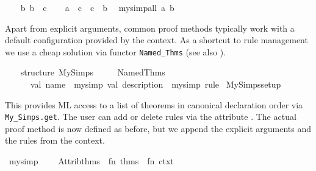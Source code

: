 \begin{isabellebody}
\ \ \isamarkupfalse%
\ b{\isacharcolon}\ {\isachardoublequoteopen}b\ {\isacharequal}\ c{\isachardoublequoteclose}\isanewline
\ \ \isamarkupfalse%
\ {\isachardoublequoteopen}a\ {\isacharequal}\ c{\isachardoublequoteclose}\ \ {\isachardoublequoteopen}c\ {\isacharequal}\ b{\isachardoublequoteclose}\ \isamarkupfalse%
\ {\isacharparenleft}my{\isacharunderscore}simp{\isacharunderscore}all\ a\ b{\isacharparenright}\isanewline
\isanewline
{}\isamarkupfalse%
%
\endisatagproof
{\isafoldproof}%
%
\isadelimproof
%
\endisadelimproof
%
\begin{isamarkuptext}%
\medskip Apart from explicit arguments, common proof methods
  typically work with a default configuration provided by the context.
  As a shortcut to rule management we use a cheap solution via functor
  \verb|Named_Thms| (see also \hyperlink{file.~~/src/Pure/Tools/named-thms.ML}{\mbox{}}).%
\end{isamarkuptext}%
\isamarkuptrue%
%
\isadelimML
%
\endisadelimML
%
\isatagML
{}\isamarkupfalse%
\ {\isacharverbatimopen}\isanewline
\ \ structure\ My{\isacharunderscore}Simps\ {\isacharequal}\isanewline
\ \ \ \ Named{\isacharunderscore}Thms\isanewline
\ \ \ \ \ \ {\isacharparenleft}val\ name\ {\isacharequal}\ {\isachardoublequote}my{\isacharunderscore}simp{\isachardoublequote}\ val\ description\ {\isacharequal}\ {\isachardoublequote}my{\isacharunderscore}simp\ rule{\isachardoublequote}{\isacharparenright}\isanewline
{\isacharverbatimclose}\isanewline
{}\isamarkupfalse%
\ My{\isacharunderscore}Simps{\isachardot}setup%
\endisatagML
{\isafoldML}%
%
\isadelimML
%
\endisadelimML
%
\begin{isamarkuptext}%
This provides ML access to a list of theorems in canonical
  declaration order via \verb|My_Simps.get|.  The user can add or
  delete rules via the attribute \hyperlink{attribute.my-simp}{\mbox{}}.  The actual
  proof method is now defined as before, but we append the explicit
  arguments and the rules from the context.%
\end{isamarkuptext}%
\isamarkuptrue%
%
\isadelimML
%
\endisadelimML
%
\isatagML
{}\isamarkupfalse%
\ my{\isacharunderscore}simp{\isacharprime}\ {\isacharequal}\ {\isacharverbatimopen}\isanewline
\ \ Attrib{\isachardot}thms\ {\isachargreater}{\isachargreater}\ {\isacharparenleft}fn\ thms\ {\isacharequal}{\isachargreater}\ fn\ ctxt\ {\isacharequal}{\isachargreater}\isanewline

\end{isabellebody}
